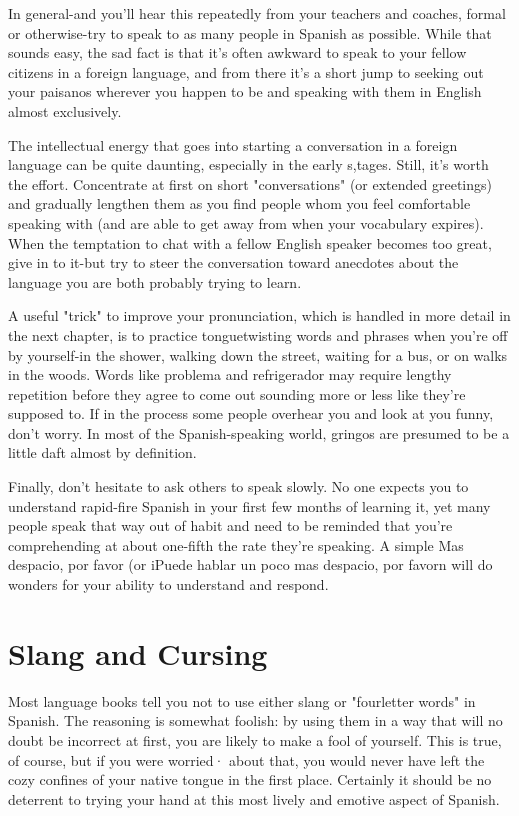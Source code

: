 In general-and you'll hear this repeatedly from your teachers
and coaches, formal or otherwise-try to speak to as many people in
Spanish as possible. While that sounds easy, the sad fact is that it's often awkward to speak to your fellow citizens in a foreign language, and
from there it's a short jump to seeking out your paisanos wherever you
happen to be and speaking with them in English almost exclusively.

The intellectual energy that goes into starting a conversation
in a foreign language can be quite daunting, especially in the early
s,tages. Still, it's worth the effort. Concentrate at first on short "conversations" (or extended greetings) and gradually lengthen them as you
find people whom you feel comfortable speaking with (and are able to
get away from when your vocabulary expires). When the temptation
to chat with a fellow English speaker becomes too great, give in to
it-but try to steer the conversation toward anecdotes about the language you are both probably trying to learn.

A useful "trick" to improve your pronunciation, which is
handled in more detail in the next chapter, is to practice tonguetwisting words and phrases when you're off by yourself-in the
shower, walking down the street, waiting for a bus, or on walks in the
woods. Words like problema and refrigerador may require lengthy
repetition before they agree to come out sounding more or less like
they're supposed to. If in the process some people overhear you and
look at you funny, don't worry. In most of the Spanish-speaking world,
gringos are presumed to be a little daft almost by definition.

Finally, don't hesitate to ask others to speak slowly. No one
expects you to understand rapid-fire Spanish in your first few months
of learning it, yet many people speak that way out of habit and need to
be reminded that you're comprehending at about one-fifth the rate
they're speaking. A simple Mas despacio, por favor (or iPuede hablar
un poco mas despacio, por favorn will do wonders for your ability to
understand and respond.

\section{Slang and Cursing}

Most language books tell you not to use either slang or "fourletter words" in Spanish. The reasoning is somewhat foolish: by using
them in a way that will no doubt be incorrect at first, you are likely to
make a fool of yourself. This is true, of course, but if you were worried·
about that, you would never have left the cozy confines of your native
tongue in the first place. Certainly it should be no deterrent to trying
your hand at this most lively and emotive aspect of Spanish.

